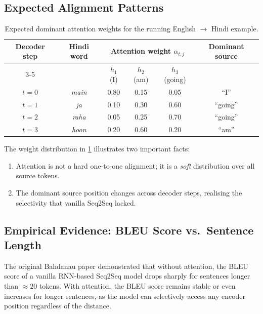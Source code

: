 \documentclass[12pt,a4paper]{article}
\begin{document}
\subsection{Expected Alignment Patterns}

\begin{table}[ht]
\centering
\caption{Expected dominant attention weights for the running
         English $\to$ Hindi example.}
\label{tab:alignment}
\begin{tabular}{@{}cccccc@{}}
\toprule
\multirow{2}{*}{\textbf{Decoder step}} &
\multirow{2}{*}{\textbf{Hindi word}} &
\multicolumn{3}{c}{\textbf{Attention weight $\alpha_{t,j}$}} &
\multirow{2}{*}{\textbf{Dominant source}} \\
\cmidrule(lr){3-5}
& & $h_1$ (I) & $h_2$ (am) & $h_3$ (going) & \\
\midrule
$t=0$ & \textit{main}  & 0.80 & 0.15 & 0.05 & ``I''     \\
$t=1$ & \textit{ja}    & 0.10 & 0.30 & 0.60 & ``going'' \\
$t=2$ & \textit{raha}  & 0.05 & 0.25 & 0.70 & ``going'' \\
$t=3$ & \textit{hoon}  & 0.20 & 0.60 & 0.20 & ``am''    \\
\bottomrule
\end{tabular}
\end{table}

The weight distribution in \cref{tab:alignment} illustrates two
important facts:
\begin{enumerate}[label=(\arabic*)]
  \item Attention is not a hard one-to-one alignment; it is a
        \emph{soft} distribution over all source tokens.
  \item The dominant source position changes across decoder steps,
        realising the selectivity that vanilla Seq2Seq lacked.
\end{enumerate}

\subsection{Empirical Evidence: BLEU Score vs.\ Sentence Length}

The original Bahdanau paper demonstrated that without attention, the
BLEU score of a vanilla RNN-based Seq2Seq model drops sharply for
sentences longer than $\approx 20$ tokens.  With attention, the BLEU
score remains stable or even increases for longer sentences, as the
model can selectively access any encoder position regardless of the
distance.
\end{document}
